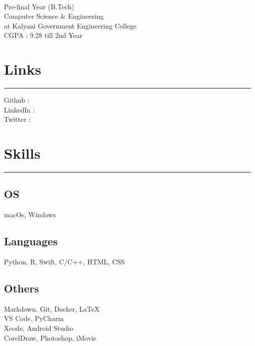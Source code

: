 \documentclass[]{debjitpal-resume}
\begin{document}
%
%

\begin{minipage}[t]{0.35\textwidth} 
\begin{large}
	\\
\end{large}
Pre-final Year (B.Tech)\\
Computer Science $\&$  Engineering\\ 
at Kalyani Government Engineering College \\ 
CGPA : 9.28 till 2nd Year 
\section{Links} 
\noindent\rule{5cm}{0.4pt}

Github : \href{https://github.com/debjitpal5040}{} \\
LinkedIn : \href{https://www.linkedin.com/in/debjit-pal-539214192/}{} \\
Twitter : \href{https://www.twitter.com/debjitpal5040}{} 
\section{Skills}
\noindent\rule{5cm}{0.4pt}
\subsection{OS}
macOs, Windows
\vspace{6pt}
\subsection{Languages}
Python, R, Swift, C/C++, HTML, CSS
\vspace{6pt}
\subsection{Others}
Markdown, Git, Docker, LaTeX \\
VS Code, PyCharm \\
Xcode, Android Studio \\
CorelDraw, Photoshop, iMovie
\sectionsep

\end{minipage}
\end{document}

